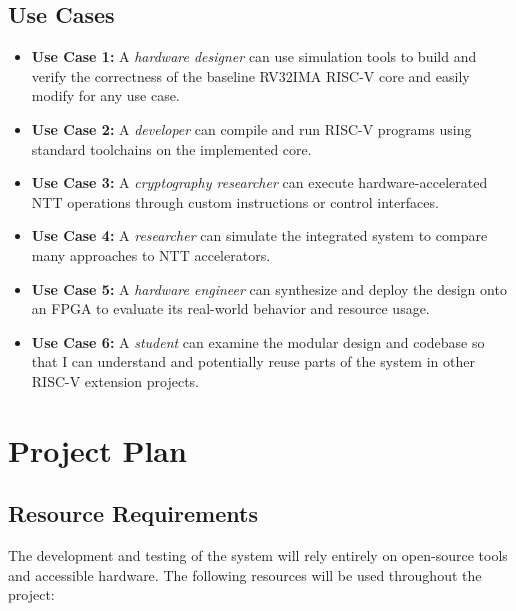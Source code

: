 \documentclass[a4paper, 12pt, titlepage]{article}
\begin{document}
\subsection{Use Cases}

\begin{itemize}
    \item \textbf{Use Case 1:} A \textit{hardware designer} can use simulation tools to build and verify the correctness of the baseline RV32IMA RISC-V core and easily modify for any use case.
    \item \textbf{Use Case 2:} A \textit{developer} can compile and run RISC-V programs using standard toolchains on the implemented core.
    \item \textbf{Use Case 3:} A \textit{cryptography researcher} can execute hardware-accelerated NTT operations through custom instructions or control interfaces.
    \item \textbf{Use Case 4:} A \textit{researcher} can simulate the integrated system to compare many approaches to NTT accelerators.
    \item \textbf{Use Case 5:} A \textit{hardware engineer} can synthesize and deploy the design onto an FPGA to evaluate its real-world behavior and resource usage.
    \item \textbf{Use Case 6:} A \textit{student} can examine the modular design and codebase so that I can understand and potentially reuse parts of the system in other RISC-V extension projects. 
\end{itemize}

\newpage
\section{Project Plan}
\subsection{Resource Requirements}

The development and testing of the system will rely entirely on open-source tools and accessible hardware. The following resources will be used throughout the project:
\end{document}
